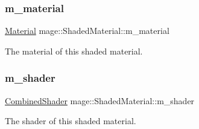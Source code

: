 \subsubsection{\texorpdfstring{m\+\_\+material}{m\_material}}
{\footnotesize\ttfamily \hyperlink{structmage_1_1_material}{Material} mage\+::\+Shaded\+Material\+::m\+\_\+material\hspace{0.3cm}{\ttfamily [private]}}

The material of this shaded material. \hypertarget{structmage_1_1_shaded_material_a712d07ac1995ff592bbb8ab20a294270}{}\label{structmage_1_1_shaded_material_a712d07ac1995ff592bbb8ab20a294270} 
\subsubsection{\texorpdfstring{m\+\_\+shader}{m\_shader}}
{\footnotesize\ttfamily \hyperlink{structmage_1_1_combined_shader}{Combined\+Shader} mage\+::\+Shaded\+Material\+::m\+\_\+shader\hspace{0.3cm}{\ttfamily [private]}}

The shader of this shaded material. 